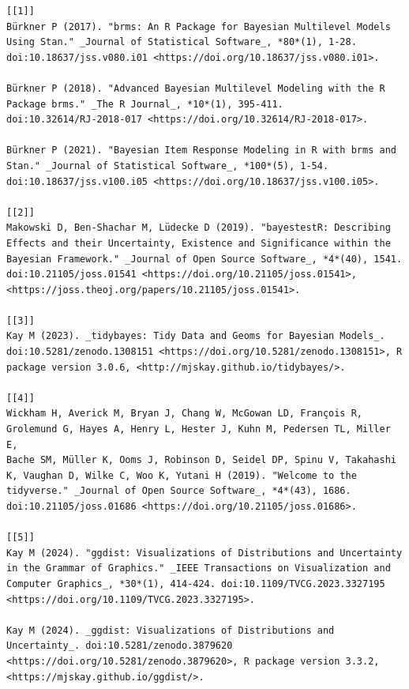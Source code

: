 \documentclass[
  doc,
  floatsintext,
  longtable,
  nolmodern,
  notxfonts,
  notimes,
  colorlinks=true,linkcolor=blue,citecolor=blue,urlcolor=blue]{apa7}
\begin{document}
\begin{verbatim}
[[1]]
Bürkner P (2017). "brms: An R Package for Bayesian Multilevel Models
Using Stan." _Journal of Statistical Software_, *80*(1), 1-28.
doi:10.18637/jss.v080.i01 <https://doi.org/10.18637/jss.v080.i01>.

Bürkner P (2018). "Advanced Bayesian Multilevel Modeling with the R
Package brms." _The R Journal_, *10*(1), 395-411.
doi:10.32614/RJ-2018-017 <https://doi.org/10.32614/RJ-2018-017>.

Bürkner P (2021). "Bayesian Item Response Modeling in R with brms and
Stan." _Journal of Statistical Software_, *100*(5), 1-54.
doi:10.18637/jss.v100.i05 <https://doi.org/10.18637/jss.v100.i05>.

[[2]]
Makowski D, Ben-Shachar M, Lüdecke D (2019). "bayestestR: Describing
Effects and their Uncertainty, Existence and Significance within the
Bayesian Framework." _Journal of Open Source Software_, *4*(40), 1541.
doi:10.21105/joss.01541 <https://doi.org/10.21105/joss.01541>,
<https://joss.theoj.org/papers/10.21105/joss.01541>.

[[3]]
Kay M (2023). _tidybayes: Tidy Data and Geoms for Bayesian Models_.
doi:10.5281/zenodo.1308151 <https://doi.org/10.5281/zenodo.1308151>, R
package version 3.0.6, <http://mjskay.github.io/tidybayes/>.

[[4]]
Wickham H, Averick M, Bryan J, Chang W, McGowan LD, François R,
Grolemund G, Hayes A, Henry L, Hester J, Kuhn M, Pedersen TL, Miller E,
Bache SM, Müller K, Ooms J, Robinson D, Seidel DP, Spinu V, Takahashi
K, Vaughan D, Wilke C, Woo K, Yutani H (2019). "Welcome to the
tidyverse." _Journal of Open Source Software_, *4*(43), 1686.
doi:10.21105/joss.01686 <https://doi.org/10.21105/joss.01686>.

[[5]]
Kay M (2024). "ggdist: Visualizations of Distributions and Uncertainty
in the Grammar of Graphics." _IEEE Transactions on Visualization and
Computer Graphics_, *30*(1), 414-424. doi:10.1109/TVCG.2023.3327195
<https://doi.org/10.1109/TVCG.2023.3327195>.

Kay M (2024). _ggdist: Visualizations of Distributions and
Uncertainty_. doi:10.5281/zenodo.3879620
<https://doi.org/10.5281/zenodo.3879620>, R package version 3.3.2,
<https://mjskay.github.io/ggdist/>.
\end{verbatim}
\end{document}
